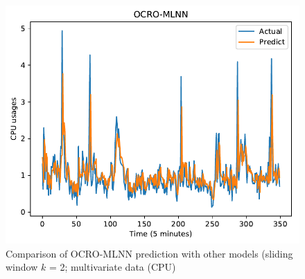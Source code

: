 \documentclass[smallcondensed, natbib]{svjour3}     %
\begin{document}
{\begin{figure}[!ht]
\begin{minipage}[b]{0.33\linewidth}
    \includegraphics[width=0.9\linewidth]{predict/k2/cpu_k2_ocro_mlnn.pdf} 
  \end{minipage} 
  
  \caption{Comparison of OCRO-MLNN prediction with other models (sliding window $k$ = 2; multivariate data (CPU)} 
  \label{predict_cpu_sliding2} 
\end{figure}

}
\end{document}
